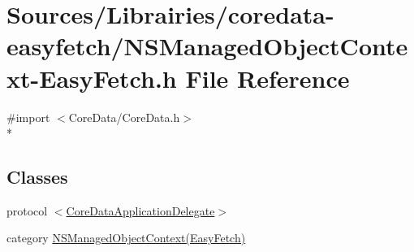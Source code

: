 \hypertarget{_n_s_managed_object_context-_easy_fetch_8h}{\section{Sources/\-Librairies/coredata-\/easyfetch/\-N\-S\-Managed\-Object\-Context-\/\-Easy\-Fetch.h File Reference}
\label{_n_s_managed_object_context-_easy_fetch_8h}
}
{\ttfamily \#import $<$Core\-Data/\-Core\-Data.\-h$>$}\\*
\subsection*{Classes}
\begin{DoxyCompactItemize}
\item 
protocol \hyperlink{protocol_core_data_application_delegate-p}{$<$\-Core\-Data\-Application\-Delegate$>$}
\item 
category \hyperlink{category_n_s_managed_object_context_07_easy_fetch_08}{N\-S\-Managed\-Object\-Context(\-Easy\-Fetch)}
\end{DoxyCompactItemize}
